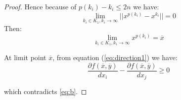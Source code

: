 \begin{proof}
Hence because of $p(k_i)-k_i \le 2n$ we have:
\begin{equation}
 \lim_{k_i \in K_1,k_i\rightarrow \infty}  ||x^{p(k_i)}-x^{k_i}||=0
\end{equation}
Then:
\begin{equation}
 \lim_{k_i \in K_1,k_i\rightarrow \infty} x^{p(k_i)}=\overline{x}
\end{equation}

At limit point $\overline{x}$, from equation (\ref{eq:direction1})  we have: 
\begin{equation*}
 \frac{\partial f(\overline{x},\overline{y})}{dx_i} - \frac{\partial f(\overline{x},\overline{y})}{dx_{j}} \ge 0
\end{equation*}




which contradicts \ref{eq:b}.

\end{proof}